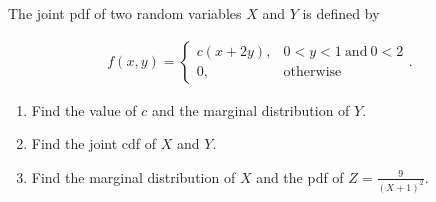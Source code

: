 
\begin{exercise}

The joint pdf of two random variables $X$ and $Y$ is defined by

\begin{align*}
    f(x, y)
    =
    \begin{cases}
        c (x + 2 y), & 0 < y < 1 ~\text{and}~ 0 < 2 \\
        0,           & \text{otherwise}
    \end{cases}.
\end{align*}

\begin{enumerate}[label = (\alph*)]
    \item Find the value of $c$ and the marginal distribution of $Y$.
    \item Find the joint cdf of $X$ and $Y$.
    \item Find the marginal distribution of $X$ and the pdf of $Z = \frac{9}{(X + 1)^2}$.
\end{enumerate}

\end{exercise}


